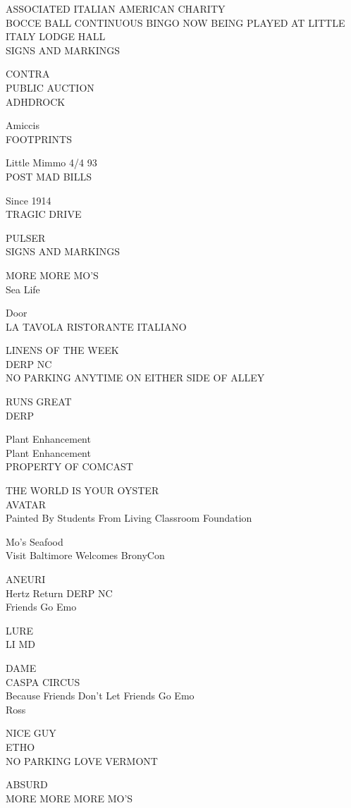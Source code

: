 \documentclass[10pt,letterpaper]{article}
\begin{document}
ASSOCIATED ITALIAN AMERICAN CHARITY\\
BOCCE BALL CONTINUOUS BINGO NOW BEING PLAYED AT LITTLE ITALY LODGE HALL\\
SIGNS AND MARKINGS

CONTRA\\
PUBLIC AUCTION\\
ADHDROCK

Amiccis\\
FOOTPRINTS

Little Mimmo 4/4 93\\
POST MAD BILLS

Since 1914\\
TRAGIC DRIVE

PULSER\\
SIGNS AND MARKINGS

MORE MORE MO'S\\
Sea Life

Door\\
LA TAVOLA RISTORANTE ITALIANO

LINENS OF THE WEEK\\
DERP NC\\
NO PARKING ANYTIME ON EITHER SIDE OF ALLEY

RUNS GREAT\\
DERP

Plant Enhancement\\
Plant Enhancement\\
PROPERTY OF COMCAST

THE WORLD IS YOUR OYSTER\\
AVATAR\\
Painted By Students From Living Classroom Foundation

Mo's Seafood\\
Visit Baltimore Welcomes BronyCon

ANEURI\\
Hertz Return DERP NC\\
Friends Go Emo

LURE\\
LI MD

DAME\\
CASPA CIRCUS\\
Because Friends Don't Let Friends Go Emo\\
Ross

NICE GUY\\
ETHO\\
NO PARKING LOVE VERMONT

ABSURD\\
MORE MORE MORE MO'S
\end{document}
